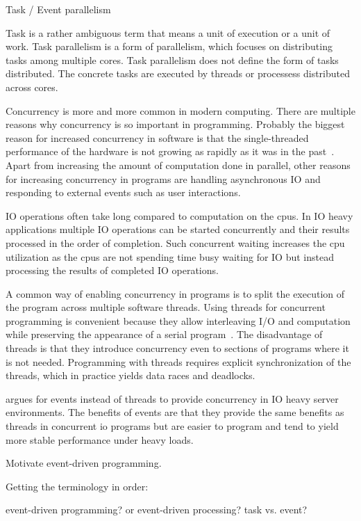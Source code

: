 Task / Event parallelism

Task is a rather ambiguous term that means a unit of execution or a unit of work. Task parallelism is a form of parallelism, which focuses on distributing tasks among multiple cores. Task parallelism does not define the form of tasks distributed. The concrete tasks are executed by threads or processess distributed across cores.

Concurrency is more and more common in modern computing. There are multiple reasons why concurrency is so important in programming. Probably the biggest reason for increased concurrency in software is that the single-threaded performance of the hardware is not growing as rapidly as it was in the past~\cite{sutter2005free}. Apart from increasing the amount of computation done in parallel, other reasons for increasing concurrency in programs are handling asynchronous IO and responding to external events such as user interactions.

IO operations often take long compared to computation on the cpus. In IO heavy applications multiple IO operations can be started concurrently and their results processed in the order of completion. Such concurrent waiting increases the cpu utilization as the cpus are not spending time busy waiting for IO but instead processing the results of completed IO operations.~\cite{dabek2002event}

A common way of enabling concurrency in programs is to split the execution of the program across multiple software threads. Using threads for concurrent programming is convenient because they allow interleaving I/O and computation while preserving the appearance of a serial program~\cite{dabek2002event}. The disadvantage of threads is that they introduce concurrency even to sections of programs where it is not needed. Programming with threads requires explicit synchronization of the threads, which in practice yields data races and deadlocks.~\cite{dabek2002event}

\cite{dabek2002event} argues for events instead of threads to provide concurrency in IO heavy server environments. The benefits of events are that they provide the same benefits as threads in concurrent io programs but are easier to program and tend to yield more stable performance under heavy loads.

Motivate event-driven programming.

Getting the terminology in order:

event-driven programming? or event-driven processing?
task vs. event?

